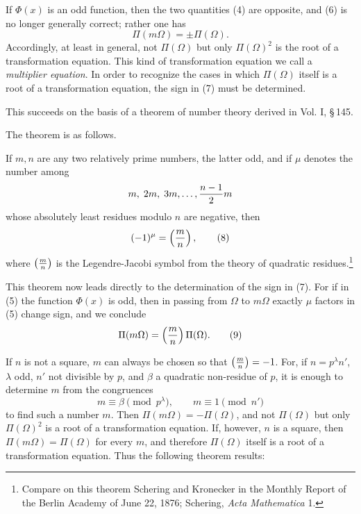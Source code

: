 \documentclass[11pt]{article}
\begin{document}
If $\Phi(x)$ is an odd function, then the two quantities (4) are opposite, and (6) is no longer generally correct; rather one has
\begin{equation}
\Pi(m\Omega)=\pm\Pi(\Omega).
\tag{7}
\end{equation}
Accordingly, at least in general, not $\Pi(\Omega)$ but only $\Pi(\Omega)^2$ is the root of a transformation equation. This kind of transformation equation we call a \emph{multiplier equation}. In order to recognize the cases in which $\Pi(\Omega)$ itself is a root of a transformation equation, the sign in (7) must be determined.

This succeeds on the basis of a theorem of number theory derived in Vol. I, \S\,145.

The theorem is as follows.

If $m,n$ are any two relatively prime numbers, the latter odd, and if $\mu$ denotes the number among
\[
m,\;2m,\;3m,\ldots,{n-1\over2}m
\]
whose absolutely least residues modulo $n$ are negative, then
\begin{equation}
(-1)^\mu=\left({m\over n}\right),
\tag{8}
\end{equation}
where $\left({m\over n}\right)$ is the Legendre-Jacobi symbol from the theory of quadratic residues.\footnote{Compare on this theorem Schering and Kronecker in the Monthly Report of the Berlin Academy of June 22, 1876; Schering, \emph{Acta Mathematica} 1.}

This theorem now leads directly to the determination of the sign in (7). For if in (5) the function $\Phi(x)$ is odd, then in passing from $\Omega$ to $m\Omega$ exactly $\mu$ factors in (5) change sign, and we conclude
\begin{equation}
\Pi(m\Omega)=\left({m\over n}\right)\Pi(\Omega).
\tag{9}
\end{equation}

If $n$ is not a square, $m$ can always be chosen so that $\left({m\over n}\right)=-1$. For, if $n=p^\lambda n'$, $\lambda$ odd, $n'$ not divisible by $p$, and $\beta$ a quadratic non-residue of $p$, it is enough to determine $m$ from the congruences
\[
m\equiv\beta\pmod {p^\lambda},\qquad m\equiv1\pmod {n'}
\]
to find such a number $m$. Then $\Pi(m\Omega)=-\Pi(\Omega)$, and not $\Pi(\Omega)$ but only $\Pi(\Omega)^2$ is a root of a transformation equation. If, however, $n$ is a square, then $\Pi(m\Omega)=\Pi(\Omega)$ for every $m$, and therefore $\Pi(\Omega)$ itself is a root of a transformation equation. Thus the following theorem results:
\end{document}
